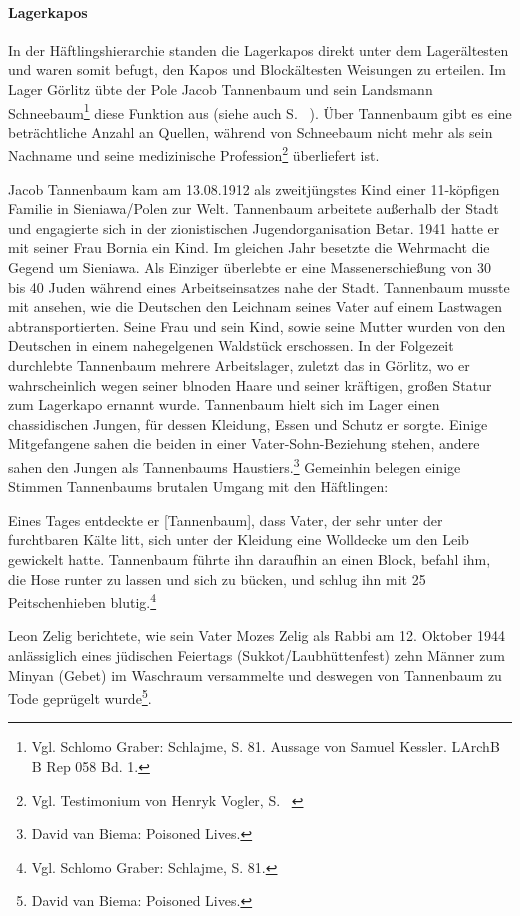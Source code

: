 \documentclass[a4paper,12pt,ngerman,
]{nisebook}
\begin{document}
\paragraph{Lagerkapos}
In der Häftlingshierarchie standen die Lagerkapos direkt unter dem Lagerältesten und waren somit befugt, den Kapos und Blockältesten Weisungen zu erteilen.
Im Lager Görlitz übte der Pole Jacob Tannenbaum und sein Landsmann Schneebaum\footnote{Vgl. Schlomo Graber: Schlajme, S. 81. Aussage von Samuel Kessler. LArchB B Rep 058 Bd. 1.} diese Funktion aus (siehe auch S. ~\pageref{kapos_ahndung}). Über Tannenbaum gibt es eine beträchtliche Anzahl an Quellen, während von Schneebaum nicht mehr als sein Nachname und seine medizinische Profession\footnote{Vgl. Testimonium von Henryk Vogler, S. ~\pageref{vogler}} überliefert ist.

Jacob Tannenbaum kam am 13.08.1912 als zweitjüngstes Kind einer 11-köpfigen Familie in Sieniawa/Polen zur Welt. Tannenbaum arbeitete außerhalb der Stadt und engagierte sich in der zionistischen Jugendorganisation Betar. 1941 hatte er mit seiner Frau Bornia ein Kind. Im gleichen Jahr besetzte die Wehrmacht die Gegend um Sieniawa. Als Einziger überlebte er eine Massenerschießung von 30 bis 40 Juden während eines Arbeitseinsatzes nahe der Stadt. Tannenbaum musste mit ansehen, wie die Deutschen den Leichnam seines Vater auf einem Lastwagen abtransportierten. Seine Frau und sein Kind, sowie seine Mutter wurden von den Deutschen in einem nahegelgenen Waldstück erschossen. In der Folgezeit durchlebte Tannenbaum mehrere Arbeitslager, zuletzt das in Görlitz, wo er wahrscheinlich wegen seiner blnoden Haare und seiner kräftigen, großen Statur zum Lagerkapo ernannt wurde.
Tannenbaum hielt sich im Lager einen chassidischen Jungen, für dessen Kleidung, Essen und Schutz er sorgte. Einige Mitgefangene sahen die beiden in einer Vater-Sohn-Beziehung stehen, andere sahen den Jungen als Tannenbaums Haustiers.\footnote{﻿David van Biema: Poisoned Lives.}
Gemeinhin belegen einige Stimmen Tannenbaums brutalen Umgang mit den Häftlingen:
\begin{leftbar}
Eines Tages entdeckte er [Tannenbaum], dass Vater, der sehr unter der furchtbaren Kälte litt, sich unter der Kleidung eine Wolldecke um den Leib gewickelt hatte. Tannenbaum führte ihn daraufhin an einen Block, befahl ihm, die Hose runter zu lassen und sich zu bücken, und schlug ihn mit 25 Peitschenhieben blutig.\footnote{Vgl. Schlomo Graber: Schlajme, S. 81.}
\end{leftbar}
Leon Zelig berichtete, wie sein Vater Mozes Zelig als Rabbi am 12. Oktober 1944 anlässiglich eines jüdischen Feiertags (Sukkot/Laubhüttenfest) zehn Männer zum Minyan (Gebet) im Waschraum versammelte und deswegen von Tannenbaum zu Tode geprügelt wurde\footnote{﻿David van Biema: Poisoned Lives.}.
\end{document}
